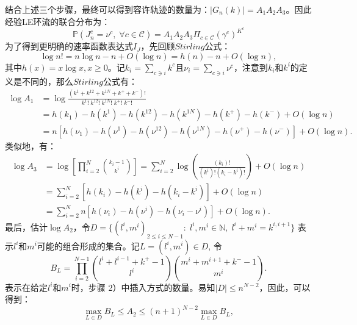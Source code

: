 结合上述三个步骤，最终可以得到容许轨迹的数量为：$|G_n(k)|=A_1A_2A_3$。因此经验LE环流的联合分布为：
\begin{equation} \label{trajectories}
    \mathbb{P}\left(J^c_n=\nu^c,\;\forall c\in\mathcal{C}\right)
    = A_1 A_2 A_3 \Pi_{c\in\mathcal{C}} (\gamma^c)^{K^c}
\end{equation}
为了得到更明确的速率函数表达式$I_J$，先回顾$Stirling$公式：
\begin{equation*}
    \log n! = n\log n-n+O(\log n)=h(n)-n+O(\log n),
\end{equation*}
其中$h(x)=x \log x, x \geqslant 0$。记$k_i=\sum_{c\ni i}k^c$且$\nu_i=\sum_{c\ni i}\nu^c$，注意到$k_i$和$k^i$的定义是不同的，那么$Stirling$公式有：
\begin{equation}\label{log A1}
    \begin{split}
    \log A_1&=\log\frac{(k^1+k^{12}+k^{1N}+k^{+}+k^{-})!}{k^1!\;k^{12}!\;k^{1N}!\;k^{+}!\;k^{-}!}\\
    &= h(k_1)-h(k^1)-h(k^{12})-h(k^{1N})-h(k^+)-h(k^-)+O(\log n)\\
    &= n\left[h(\nu_1)-h(\nu^1)-h(\nu^{12})-h(\nu^{1N})-h(\nu^+)-h(\nu^-)\right]+O(\log n).
    \end{split}
\end{equation}
类似地，有：
\begin{equation}\label{log A3}
    \begin{split}
    \log A_3&=\log\left[\prod_{i=2}^N\binom{k_i-1}{k^{i}}\right]
    =\sum_{i=2}^N\log\left(\frac{\left(k_i\right)!}{\left(k^i\right)!\left(k_i-k^i\right)!}\right)+O(\log n)\\
    &=\sum_{i=2}^N\left[h(k_i)-h(k^i)-h(k_i-k^i)\right]+O(\log n)\\
    &=\sum_{i=2}^Nn\left[h(\nu_i )-h(\nu^i)-h(\nu_i-\nu^i)\right]+O(\log n).
    \end{split}
\end{equation}
最后，估计$\log A_2$，令$D = \{(l^i,m^i)_{2\le i\le N-1}:\;l^i,m^i\in\mathbb{N},\;l^i+m^i=k^{i,i+1}\}$ 表示$l^i$和$m^i$可能的组合形成的集合。记$L = (l^i,m^i)\in D$, 令
\begin{equation*}
    B_L=\prod_{i=2}^{N-1}\binom{l^{i}+l^{i-1}+k^{+}-1}{l^{i}}\binom{m^{i}+m^{i+1}+k^{-}-1}{m^{i}}.
\end{equation*}
表示在给定$l^i$和$m^i$时，步骤 2）中插入方式的数量。易知$|D| \leqslant n^{N-2}$，因此，可以得到：
\begin{equation}\label{inequality}
    \max_{L\in D}B_L \le A_2 \le (n+1)^{N-2} \max_{L\in D}B_L,
\end{equation}
